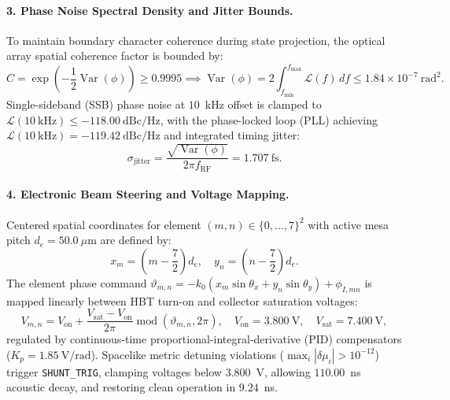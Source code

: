 \documentclass[11pt,onecolumn]{article}
\begin{document}
\paragraph{3. Phase Noise Spectral Density and Jitter Bounds.}
To maintain boundary character coherence during state projection, the optical array spatial coherence factor is bounded by:
\begin{equation}
\label{eq:inp_coherence}
C = \exp\left(-\frac{1}{2} \operatorname{Var}(\phi)\right) \ge 0.9995 \implies \operatorname{Var}(\phi) = 2 \int_{f_{\min}}^{f_{\max}} \mathcal{L}(f)\,df \le 1.84 \times 10^{-7}~\text{rad}^2.
\end{equation}
Single-sideband (SSB) phase noise at $10$~kHz offset is clamped to $\mathcal{L}(10~\text{kHz}) \le -118.00~\text{dBc/Hz}$, with the phase-locked loop (PLL) achieving $\mathcal{L}(10~\text{kHz}) = -119.42~\text{dBc/Hz}$ and integrated timing jitter:
\begin{equation}
\label{eq:inp_jitter}
\sigma_{\mathrm{jitter}} = \frac{\sqrt{\operatorname{Var}(\phi)}}{2\pi f_{\mathrm{RF}}} = 1.707~\text{fs}.
\end{equation}

\paragraph{4. Electronic Beam Steering and Voltage Mapping.}
Centered spatial coordinates for element $(m, n) \in \{0, \dots, 7\}^2$ with active mesa pitch $d_e = 50.0~\mu\text{m}$ are defined by:
\begin{equation}
\label{eq:inp_coords}
x_m = \left(m - \frac{7}{2}\right) d_e, \quad y_n = \left(n - \frac{7}{2}\right) d_e.
\end{equation}
The element phase command $\vartheta_{m,n} = -k_0(x_m \sin \theta_x + y_n \sin \theta_y) + \phi_{I,mn}$ is mapped linearly between HBT turn-on and collector saturation voltages:
\begin{equation}
\label{eq:inp_voltage_map}
V_{m,n} = V_{\mathrm{on}} + \frac{V_{\mathrm{sat}} - V_{\mathrm{on}}}{2\pi} \operatorname{mod}(\vartheta_{m,n}, 2\pi), \quad V_{\mathrm{on}} = 3.800~\text{V}, \quad V_{\mathrm{sat}} = 7.400~\text{V},
\end{equation}
regulated by continuous-time proportional-integral-derivative (PID) compensators ($K_p = 1.85~\text{V/rad}$). Spacelike metric detuning violations ($\max_i |\delta\mu_i| > 10^{-12}$) trigger \texttt{SHUNT\_TRIG}, clamping voltages below $3.800$~V, allowing $110.00$~ns acoustic decay, and restoring clean operation in $9.24$~ns.
\end{document}
